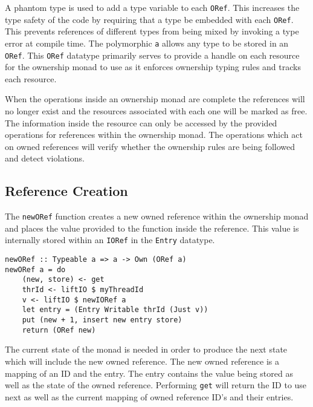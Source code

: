 \documentclass[onehalf,11pt]{beavtex}
\begin{document}
A phantom type is used to add a type variable to each \texttt{ORef}. This
increases the type safety of the code by requiring that a type be embedded
with each \texttt{ORef}.
This prevents references of different types from being mixed by invoking a
type error at compile time.
The polymorphic \texttt{a} allows any type to be stored in an \texttt{ORef}.
This \texttt{ORef} datatype primarily serves to provide a handle on each
resource for the ownership monad to use as it enforces ownership typing rules
and tracks each resource.

When the operations inside an ownership monad are complete the references
will no longer exist and the resources associated with each one will be marked
as free.
The information inside the resource can only be accessed by the provided
operations for references within the ownership monad.
The operations which act on owned references will verify whether the ownership
rules are being followed and detect violations.


\subsection{Reference Creation}

The \texttt{newORef} function creates a new owned reference
within the ownership monad and places the value provided to the function
inside the reference. This value is internally stored within an \texttt{IORef}
in the \texttt{Entry} datatype.

\begin{verbatim}
newORef :: Typeable a => a -> Own (ORef a)
newORef a = do
    (new, store) <- get
    thrId <- liftIO $ myThreadId
    v <- liftIO $ newIORef a
    let entry = (Entry Writable thrId (Just v))
    put (new + 1, insert new entry store)
    return (ORef new)
\end{verbatim}

The current state of the monad is needed in order to produce the next state
which will include the new owned reference.
The new owned reference is a mapping of an ID and the entry. The entry
contains the value being stored as well as the state of the owned reference.
Performing \texttt{get} will return the ID to use next as well as the current
mapping of owned reference ID's and their entries.
\end{document}
